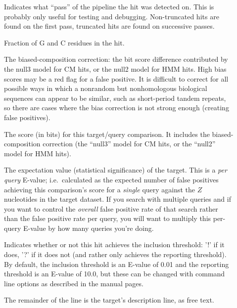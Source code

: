 \begin{description}
\item[] 
  Indicates what ``pass'' of the pipeline the hit was detected
  on. This is probably only useful for testing and
  debugging. Non-truncated hits are found on the first pass, truncated
  hits are found on successive passes.

\item[] 
  Fraction of G and C residues in the hit. 

\item[] The biased-composition correction: the bit
  score difference contributed by the null3 model for CM hits, or the
  null2 model for HMM hits. High bias scores may be a red flag for a
  false positive.  It is difficult to correct for all possible ways in
  which a nonrandom but nonhomologous biological sequences can appear
  to be similar, such as short-period tandem repeats, so there are
  cases where the bias correction is not strong enough (creating false
  positives).

\item[]
  The score (in bits) for this target/query comparison. It includes
  the biased-composition correction (the ``null3'' model for CM hits,
  or the ``null2'' model for HMM hits). 

\item[] The expectation value
  (statistical significance) of the target.  This is a \emph{per
  query} E-value; i.e.\ calculated as the expected number of false
  positives achieving this comparison's score for a \emph{single}
  query against the $Z$ nucleotides in the target dataset.  If you
  search with multiple queries and if you want to control the
  \emph{overall} false positive rate of that search rather than the
  false positive rate per query, you will want to multiply this
  per-query E-value by how many queries you're doing.

\item[] 
  Indicates whether or not this hit achieves the inclusion threshold:
  '!' if it does, '?' if it does not (and rather only achieves the
  reporting threshold). By default, the inclusion threshold is an
  E-value of 0.01 and the reporting threshold is an E-value of 10.0,
  but these can be changed with command line options as described in
  the manual pages.

\item[] 
  The remainder of the line is the target's description line, as free text.
\end{description}

